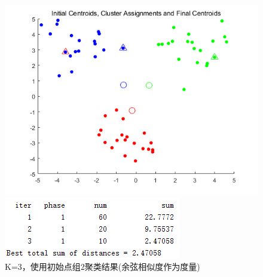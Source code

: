 \documentclass[cn]{elegantbook}
\begin{document}
\begin{figure}[!h]
	\centering
	\begin{minipage}{0.48\linewidth}
		\centering
		\includegraphics[width=\linewidth]{images/res324}
	\end{minipage}
	\begin{minipage}{0.48\linewidth}
		\centering
		\includegraphics[width=\linewidth]{images/res325}
	\end{minipage}
	\caption{\label{res323}K=3，使用初始点组2聚类结果(余弦相似度作为度量)}
\end{figure}
\end{document}
